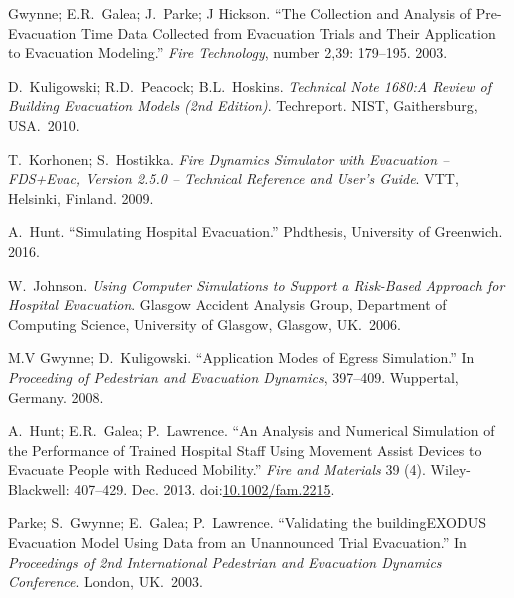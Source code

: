 \documentclass{style/llncs}
\begin{document}
{\begin{thebibliography}{36}
Gwynne; E.R.~Galea; J.~Parke; J Hickson. \textquotedblleft{}The Collection and Analysis of Pre-Evacuation Time Data Collected from Evacuation Trials and Their Application to Evacuation Modeling.\textquotedblright{} \emph{Fire Technology}, number 2,39: 179–195. 2003.\label{34}%

D.~Kuligowski; R.D.~Peacock; B.L.~Hoskins. \emph{Technical Note 1680:A Review of Building Evacuation Models (2nd Edition)}. Techreport. NIST, Gaithersburg, USA.~2010.\label{2}%

T.~Korhonen; S.~Hostikka. \emph{Fire Dynamics Simulator with Evacuation – FDS+Evac, Version 2.5.0 – Technical Reference and User’s Guide}. VTT, Helsinki, Finland. 2009.\label{32}%

A.~Hunt. \textquotedblleft{}Simulating Hospital Evacuation.\textquotedblright{} Phdthesis, University of Greenwich. 2016.\label{10}%

W.~Johnson. \emph{Using Computer Simulations to Support a Risk-Based Approach for Hospital Evacuation}. Glasgow Accident Analysis Group, Department of Computing Science, University of Glasgow, Glasgow, UK.~2006.\label{11}%

M.V Gwynne; D.~Kuligowski. \textquotedblleft{}Application Modes of Egress Simulation.\textquotedblright{} In \emph{Proceeding of Pedestrian and Evacuation Dynamics}, 397–409. Wuppertal, Germany. 2008.\label{6}%

A.~Hunt; E.R.~Galea; P.~Lawrence. \textquotedblleft{}An Analysis and Numerical Simulation of the Performance of Trained Hospital Staff Using Movement Assist Devices to Evacuate People with Reduced Mobility.\textquotedblright{} \emph{Fire and Materials} 39 (4). Wiley-Blackwell: 407–429. Dec. 2013. doi:\href{https://dx.doi.org/10.1002/fam.2215}{10.1002/fam.2215}.\label{21}%

Parke; S.~Gwynne; E.~Galea; P.~Lawrence. \textquotedblleft{}Validating the buildingEXODUS Evacuation Model Using Data from an Unannounced Trial Evacuation.\textquotedblright{} In \emph{Proceedings of 2nd International Pedestrian and Evacuation Dynamics Conference}. London, UK.~2003.\label{9}%


\end{thebibliography}}
\end{document}
